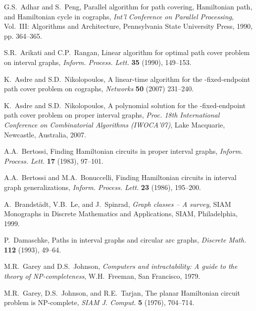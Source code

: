 \documentclass[10pt]{article}
\begin{document}
\begin{thebibliography}{99}
 G.S.~Adhar and S.~Peng, Parallel algorithm for path covering,
Hamiltonian path, and Hamiltonian cycle in cographs, {\it Int'l
Conference on Parallel Processing}, Vol.~III: Algorithms and
Architecture, Pennsylvania State University Press, 1990, pp.
364--365.

 S.R.~Arikati and C.P.~Rangan, Linear algorithm for optimal path
cover problem on interval graphs, {\it Inform. Process. Lett.}
{\bf 35} (1990), 149--153.

 K.~Asdre and S.D.~Nikolopoulos, A linear-time algorithm for the
-fixed-endpoint path cover problem on cographs, {\it Networks}
{\bf 50} (2007) 231--240.

 K.~Asdre and S.D.~Nikolopoulos, A polynomial solution for the
-fixed-endpoint path cover problem on proper interval graphs,
{\it Proc. 18th International Conference on Combinatorial
Algorithms (IWOCA'07)}, Lake Macquarie, Newcastle, Australia,
2007.



 A.A.~Bertossi, Finding Hamiltonian circuits in proper interval
graphs, {\it Inform. Process. Lett.} {\bf 17} (1983), 97--101.

 A.A.~Bertossi and M.A.~Bonuccelli, Finding Hamiltonian circuits in
interval graph generalizations, {\it Inform. Process. Lett.} {\bf
23} (1986), 195--200.

 A.~Brandst\"{a}dt, V.B.~Le, and J.~Spinrad, {\it Graph classes --
A survey}, SIAM Monographs in Discrete Mathematics and
Applications, SIAM, Philadelphia, 1999.









 P.~Damaschke, Paths in interval graphs and circular arc graphs,
{\it Discrete Math.} {\bf 112} (1993), 49--64.



 M.R.~Garey and D.S.~Johnson, {\it Computers and intractability: A
guide to the theory of NP-completeness}, W.H.~Freeman, San
Francisco, 1979.

 M.R.~Garey, D.S.~Johnson, and R.E.~Tarjan, The planar Hamiltonian
circuit problem is NP-complete, {\it SIAM J. Comput.} {\bf 5}
(1976), 704--714.




\end{thebibliography}
\end{document}
